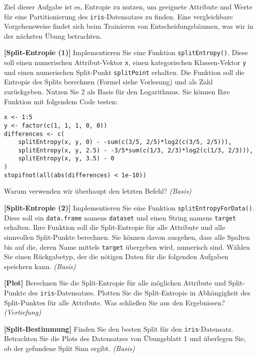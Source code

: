 \documentclass[headinclude,headsepline]{scrartcl}
\newcommand{\taskcategory}[1]{{\color[HTML]{800000}\emph{(#1)}}}
\newcommand{\taskname}[1]{\textbf{[#1]}}
\newcommand{\code}[1]{{\color[HTML]{000080}\texttt{#1}}}
\begin{document}
Ziel dieser Aufgabe ist es, Entropie zu nutzen, um geeignete Attribute und Werte für eine Partitionierung des \code{iris}-Datensatzes zu finden.
Eine vergleichbare Vorgehensweise findet sich beim Trainieren von Entscheidungsbäumen, was wir in der nächsten Übung betrachten.

\vspace{10pt}

\begin{compactenum}[a)]\itemsep10pt
	\item
	\taskname{Split-Entropie (1)}
	Implementieren Sie eine Funktion \code{splitEntropy()}.
	Diese soll einen numerischen Attribut-Vektor \code{x}, einen kategorischen Klassen-Vektor \code{y} und einen numerischen Split-Punkt \code{splitPoint} erhalten.
	Die Funktion soll die Entropie des Splits berechnen (Formel siehe Vorlesung) und als Zahl zurückgeben.
	Nutzen Sie 2 als Basis für den Logarithmus.
	Sie können Ihre Funktion mit folgendem Code testen:
	
	\begin{lstlisting}
x <- 1:5
y <- factor(c(1, 1, 1, 0, 0))
differences <- c(
	splitEntropy(x, y, 0) - -sum(c(3/5, 2/5)*log2(c(3/5, 2/5))),
	splitEntropy(x, y, 2.5) - -3/5*sum(c(1/3, 2/3)*log2(c(1/3, 2/3))),
	splitEntropy(x, y, 3.5) - 0
)
stopifnot(all(abs(differences) < 1e-10))
	\end{lstlisting}
	
	Warum verwenden wir überhaupt den letzten Befehl?
	\taskcategory{Basis}
	\item
	\taskname{Split-Entropie (2)}
	Implementieren Sie eine Funktion \code{splitEntropyForData()}.
	Diese soll ein \code{data.frame} namens \code{dataset} und einen String namens \code{target} erhalten.
	Ihre Funktion soll die Split-Entropie für alle Attribute und alle sinnvollen Split-Punkte berechnen.
	Sie können davon ausgehen, dass alle Spalten bis auf die, deren Name mittels \code{target} übergeben wird, numerisch sind.
	Wählen Sie einen Rückgabetyp, der die nötigen Daten für die folgenden Aufgaben speichern kann.
	\taskcategory{Basis}
	\item
	\taskname{Plot}
	Berechnen Sie die Split-Entropie für alle möglichen Attribute und Split-Punkte des \code{iris}-Datensatzes.
	Plotten Sie die Split-Entropie in Abhängigkeit des Split-Punktes für alle Attribute.
	Was schließen Sie aus den Ergebnissen?
	\taskcategory{Vertiefung}
	\item
	\taskname{Split-Bestimmung}
	Finden Sie den besten Split für den \code{iris}-Datensatz.
	Betrachten Sie die Plots des Datensatzes von Übungsblatt 1 und überlegen Sie, ob der gefundene Split Sinn ergibt.
	\taskcategory{Basis}
\end{compactenum}
\end{document}

